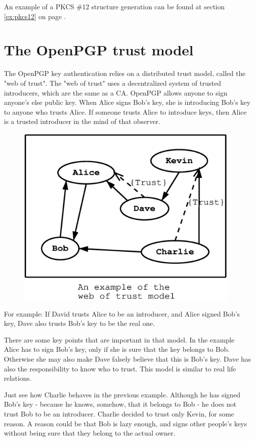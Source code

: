 An example of a PKCS \#12 structure generation can be found at section \ref{ex:pkcs12}
on page \pageref{ex:pkcs12}.

\section{The OpenPGP trust model}
\label{pgp:trust}

The OpenPGP key authentication relies on a distributed trust model, called
the "web of trust". The "web of trust" uses a decentralized system of 
trusted introducers, which are the same as a CA. OpenPGP allows anyone to 
sign anyone's else public key. When Alice signs Bob's key, she is introducing 
Bob's key to anyone who trusts Alice. If someone trusts Alice to introduce
keys, then Alice is a trusted introducer in the mind of that observer.

\begin{figure}[hbtp]
\includegraphics[height=9cm,width=11cm]{pgp-fig1}
\label{fig:pgp1}
\end{figure}

For example: If David trusts Alice to be an introducer, and Alice signed
Bob's key, Dave also trusts Bob's key to be the real one.

There are some key points that are important in that model. In the example
Alice has to sign Bob's key, only if she is sure that the key belongs
to Bob. Otherwise she may also make Dave falsely believe that this
is Bob's key. Dave has also the responsibility to know who to trust.
This model is similar to real life relations.

Just see how Charlie behaves in the previous example. Although he has 
signed Bob's key - because he knows, somehow, that it belongs to Bob - 
he does not trust Bob to be an introducer. Charlie decided to trust only 
Kevin, for some reason. A reason could be that Bob is lazy enough, and 
signs other people's keys without being sure that they belong to the 
actual owner.

